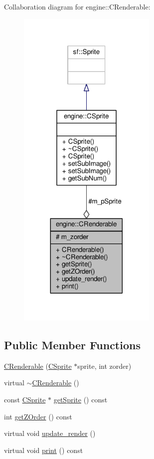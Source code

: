 Collaboration diagram for engine\-:\-:C\-Renderable\-:
\nopagebreak
\begin{figure}[H]
\begin{center}
\leavevmode
\includegraphics[width=188pt]{classengine_1_1CRenderable__coll__graph}
\end{center}
\end{figure}
\subsection*{Public Member Functions}
\begin{DoxyCompactItemize}
\item 
\hyperlink{classengine_1_1CRenderable_a7e3ce1f0124ed742ceeba68da818a1ba}{C\-Renderable} (\hyperlink{classengine_1_1CSprite}{C\-Sprite} $\ast$sprite, int zorder)
\item 
virtual \hyperlink{classengine_1_1CRenderable_a81c5184283062df81c5a58dc65d1073f}{$\sim$\-C\-Renderable} ()
\item 
const \hyperlink{classengine_1_1CSprite}{C\-Sprite} $\ast$ \hyperlink{classengine_1_1CRenderable_a0f1f308d7df323b758c5bf26636da70c}{get\-Sprite} () const 
\item 
int \hyperlink{classengine_1_1CRenderable_a879799118bf52e40778062a8011c7e26}{get\-Z\-Order} () const 
\item 
virtual void \hyperlink{classengine_1_1CRenderable_a6d41accd127135dd40610bd234b1eddd}{update\-\_\-render} ()
\item 
virtual void \hyperlink{classengine_1_1CRenderable_a75898940a99cee496718067698f2fdd6}{print} () const 
\end{DoxyCompactItemize}
